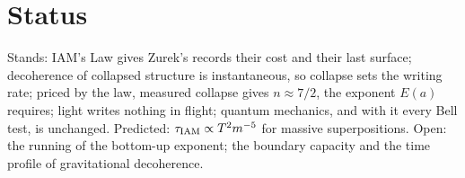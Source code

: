 \section{Status}
Stands: IAM's Law gives Zurek's records their cost and their last surface; decoherence of collapsed structure is instantaneous, so collapse sets the
writing rate; priced by the law, measured collapse gives $n\approx7/2$, the exponent $E(a)$ requires; light writes nothing in flight; quantum mechanics,
and with it every Bell test, is unchanged. Predicted: $\tau_{\rm IAM}\propto T^2m^{-5}$ for massive superpositions. Open: the running of the bottom-up
exponent; the boundary capacity and the time profile of gravitational decoherence.
